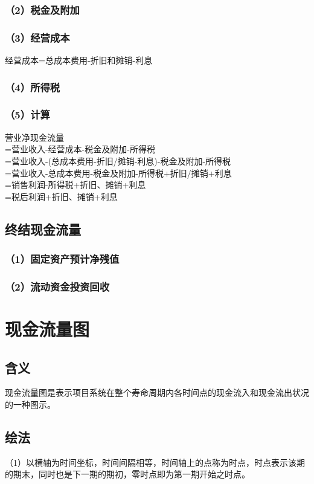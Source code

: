 \subsubsection{（2）税金及附加}
\subsubsection{（3）经营成本}
\noindent 经营成本=总成本费用-折旧和摊销-利息
\subsubsection{（4）所得税}
\subsubsection{（5）计算}
\noindent 营业净现金流量\\
=营业收入-经营成本-税金及附加-所得税\\
=营业收入-(总成本费用-折旧/摊销-利息)-税金及附加-所得税\\
=营业收入-总成本费用-税金及附加-所得税+折旧/摊销+利息\\
=销售利润-所得税+折旧、摊销+利息\\
=税后利润+折旧、摊销+利息

\subsection{终结现金流量}
\subsubsection{（1）固定资产预计净残值}
\subsubsection{（2）流动资金投资回收}

\section{现金流量图}
\subsection{含义}
现金流量图是表示项目系统在整个寿命周期内各时间点的现金流入和现金流出状况的一种图示。

\subsection{绘法}
（1）以横轴为时间坐标，时间间隔相等，时间轴上的点称为时点，时点表示该期的期末，同时也是下一期的期初，零时点即为第一期开始之时点。

